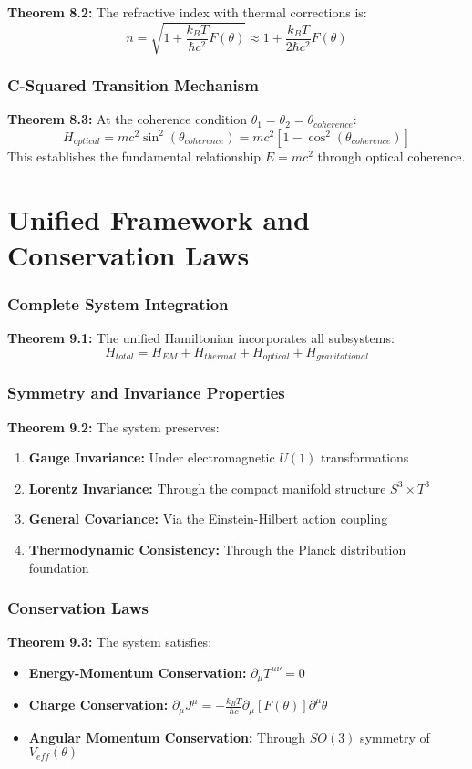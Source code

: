﻿\documentclass[12pt]{article}
\begin{document}
\textbf{Theorem 8.2:} The refractive index with thermal corrections is:
$$n = \sqrt{1 + \frac{k_B T}{\hbar c^2}F(\theta)} \approx 1 + \frac{k_B T}{2\hbar c^2}F(\theta)$$

\subsubsection{C-Squared Transition Mechanism}
\textbf{Theorem 8.3:} At the coherence condition $\theta_1 = \theta_2 = \theta_{coherence}$:
$$H_{optical} = mc^2\sin^2(\theta_{coherence}) = mc^2[1 - \cos^2(\theta_{coherence})]$$
This establishes the fundamental relationship $E = mc^2$ through optical coherence.

\section{Unified Framework and Conservation Laws}

\subsubsection{Complete System Integration}
\textbf{Theorem 9.1:} The unified Hamiltonian incorporates all subsystems:
$$H_{total} = H_{EM} + H_{thermal} + H_{optical} + H_{gravitational}$$

\subsubsection{Symmetry and Invariance Properties}
\textbf{Theorem 9.2:} The system preserves:
\begin{enumerate}
   \item \textbf{Gauge Invariance:} Under electromagnetic $U(1)$ transformations
   \item \textbf{Lorentz Invariance:} Through the compact manifold structure $S^3 \times T^3$
   \item \textbf{General Covariance:} Via the Einstein-Hilbert action coupling
   \item \textbf{Thermodynamic Consistency:} Through the Planck distribution foundation
\end{enumerate}

\subsubsection{Conservation Laws}
\textbf{Theorem 9.3:} The system satisfies:
\begin{itemize}
   \item \textbf{Energy-Momentum Conservation:} $\partial_\mu T^{\mu\nu} = 0$
   \item \textbf{Charge Conservation:} $\partial_\mu J^\mu = -\frac{k_B T}{\hbar c}\partial_\mu[F(\theta)]\partial^\mu\theta$
   \item \textbf{Angular Momentum Conservation:} Through $SO(3)$ symmetry of $V_{eff}(\theta)$
\end{itemize}
\end{document}

